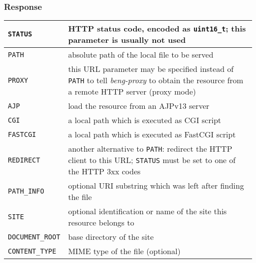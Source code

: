 \documentclass[a4paper,12pt]{article}
\begin{document}
\subsubsection{Response}

\begin{tabular}{|l|p{10cm}|}
\hline
\texttt{STATUS} & HTTP status code, encoded as \texttt{uint16\_t};
this parameter is usually not used \\
\hline

\texttt{PATH} & absolute path of the local file to be served \\

\hline

\texttt{PROXY} & this URL parameter may be specified instead of
\texttt{PATH} to tell \emph{beng-proxy} to obtain the resource from a
remote HTTP server (proxy mode) \\

\hline

\texttt{AJP} & load the resource from an AJPv13 server \\

\hline

\texttt{CGI} & a local path which is executed as CGI script \\

\hline

\texttt{FASTCGI} & a local path which is executed as FastCGI script \\

\hline

\texttt{REDIRECT} & another alternative to \texttt{PATH}: redirect the
HTTP client to this URL; \texttt{STATUS} must be set to one of the
HTTP 3xx codes \\

\hline

\texttt{PATH\_INFO} & optional URI substring which was left after
finding the file \\

\hline

\texttt{SITE} & optional identification or name of the site this
resource belongs to \\

\hline

\texttt{DOCUMENT\_ROOT} & base directory of the site \\

\hline

\texttt{CONTENT\_TYPE} & MIME type of the file (optional) \\


\end{tabular}
\end{document}
